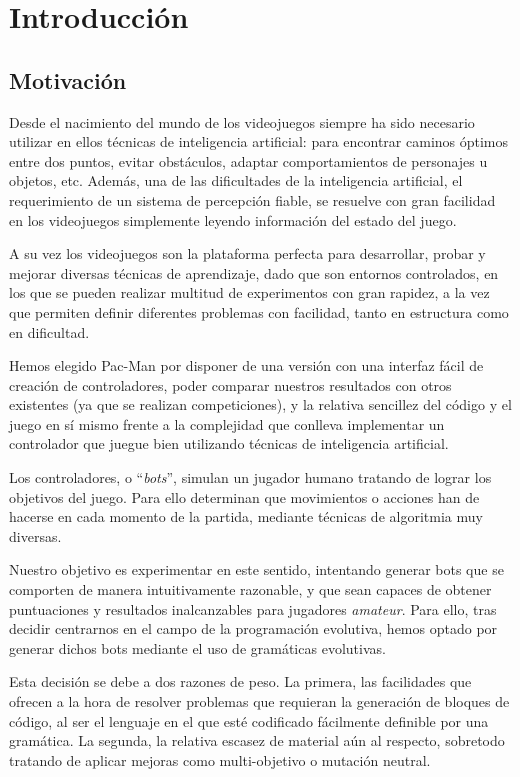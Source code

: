 \chapter{Introducción} \label{cap:introduccion}

\section{Motivación}
Desde el nacimiento del mundo de los videojuegos siempre ha sido necesario utilizar en ellos técnicas de inteligencia artificial: para encontrar caminos óptimos entre dos puntos, evitar obstáculos, adaptar comportamientos de personajes u objetos, etc. Además, una de las dificultades de la inteligencia artificial, el requerimiento de un sistema de percepción fiable, se resuelve con gran facilidad en los videojuegos simplemente leyendo información del estado del juego.

A su vez los videojuegos son la plataforma perfecta para desarrollar, probar y mejorar diversas técnicas de aprendizaje, dado que son entornos controlados, en los que se pueden realizar multitud de experimentos con gran rapidez, a la vez que permiten definir diferentes problemas con facilidad, tanto en estructura como en dificultad. 
 
Hemos elegido Pac-Man por disponer de una versión con una interfaz fácil de creación de controladores, poder comparar nuestros resultados con otros existentes (ya que se realizan competiciones), y la relativa sencillez del código y el juego en sí mismo frente a la complejidad que conlleva implementar un controlador que juegue bien utilizando técnicas de inteligencia artificial.
 
Los controladores, o ``\textit{bots}'', simulan un jugador humano tratando de lograr los objetivos del juego. Para ello determinan que movimientos o acciones han de hacerse en cada momento de la partida, mediante técnicas de algoritmia muy diversas.
 
Nuestro objetivo es experimentar en este sentido, intentando generar bots que se comporten de manera  intuitivamente razonable,  y que sean capaces de obtener puntuaciones y resultados inalcanzables para jugadores \textit{amateur}. Para ello, tras decidir centrarnos en el campo de la programación evolutiva, hemos optado por generar dichos bots mediante el uso de gramáticas evolutivas.

Esta decisión se debe a dos razones de peso. La primera, las facilidades que ofrecen a la hora de resolver problemas que requieran la generación de bloques de código, al ser el lenguaje en el que esté codificado fácilmente definible por una gramática. La segunda, la relativa escasez de material aún al respecto, sobretodo tratando de aplicar mejoras como multi-objetivo o mutación neutral.

